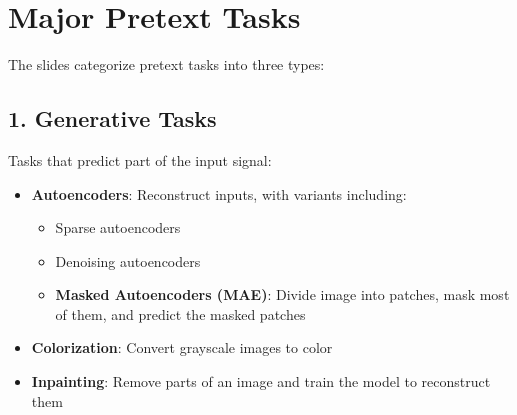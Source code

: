 \section*{Major Pretext Tasks}

The slides categorize pretext tasks into three types:

\subsection*{1. Generative Tasks}
Tasks that predict part of the input signal:
\begin{itemize}
    \item \textbf{Autoencoders}: Reconstruct inputs, with variants including:
    \begin{itemize}
        \item Sparse autoencoders
        \item Denoising autoencoders
        \item \textbf{Masked Autoencoders (MAE)}: Divide image into patches, mask most of them, and predict the masked patches
    \end{itemize}
    \item \textbf{Colorization}: Convert grayscale images to color
    \item \textbf{Inpainting}: Remove parts of an image and train the model to reconstruct them
\end{itemize}

